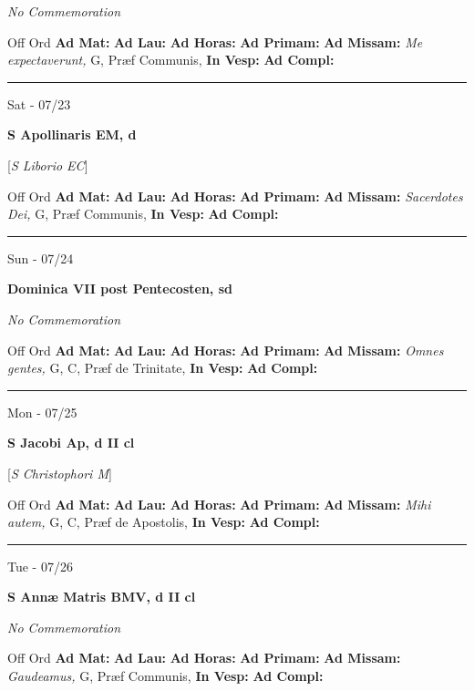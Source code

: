 \documentclass[letterpaper, 10pt]{article}
\begin{document}
\textit{No Commemoration}\begin{justify}
Off Ord
\textbf{Ad Mat: }
\textbf{Ad Lau: }
\textbf{Ad Horas: }
\textbf{Ad Primam: }
\textbf{Ad Missam:} \textit{Me expectaverunt, } G, Præf Communis, 
\textbf{In Vesp: }
\textbf{Ad Compl: }\end{justify}



\hrule
\begin{center}
Sat - 07/23
\end{center}\textbf{ \large S Apollinaris EM, \textnormal{\normalsize d}}

[\textit{S Liborio EC}]
\begin{justify}
Off Ord
\textbf{Ad Mat: }
\textbf{Ad Lau: }
\textbf{Ad Horas: }
\textbf{Ad Primam: }
\textbf{Ad Missam:} \textit{Sacerdotes Dei, } G, Præf Communis, 
\textbf{In Vesp: }
\textbf{Ad Compl: }\end{justify}



\hrule
\begin{center}
Sun - 07/24
\end{center}\textbf{ \large Dominica VII post Pentecosten, \textnormal{\normalsize sd}}

\textit{No Commemoration}\begin{justify}
Off Ord
\textbf{Ad Mat: }
\textbf{Ad Lau: }
\textbf{Ad Horas: }
\textbf{Ad Primam: }
\textbf{Ad Missam:} \textit{Omnes gentes, } G, C, Præf de Trinitate, 
\textbf{In Vesp: }
\textbf{Ad Compl: }\end{justify}



\hrule
\begin{center}
Mon - 07/25
\end{center}\textbf{ \large S Jacobi Ap, \textnormal{\normalsize d II cl}}

[\textit{S Christophori M}]
\begin{justify}
Off Ord
\textbf{Ad Mat: }
\textbf{Ad Lau: }
\textbf{Ad Horas: }
\textbf{Ad Primam: }
\textbf{Ad Missam:} \textit{Mihi autem, } G, C, Præf de Apostolis, 
\textbf{In Vesp: }
\textbf{Ad Compl: }\end{justify}



\hrule
\begin{center}
Tue - 07/26
\end{center}\textbf{ \large S Annæ Matris BMV, \textnormal{\normalsize d II cl}}

\textit{No Commemoration}\begin{justify}
Off Ord
\textbf{Ad Mat: }
\textbf{Ad Lau: }
\textbf{Ad Horas: }
\textbf{Ad Primam: }
\textbf{Ad Missam:} \textit{Gaudeamus, } G, Præf Communis, 
\textbf{In Vesp: }
\textbf{Ad Compl: }\end{justify}
\end{document}
